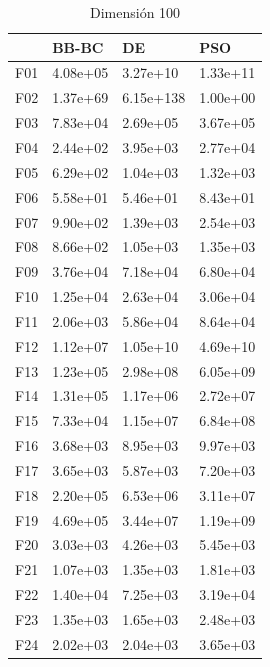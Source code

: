 \begin{table}[H]
\begin{minipage}{.5\linewidth}
    \end{minipage}%
    \begin{minipage}{.5\linewidth}
      \centering
      \caption{Dimensión 100}
      \begin{tabular}{llll}
        \toprule
        {} &     BB-BC &         DE &       PSO \\
        \midrule
        F01  &  4.08e+05 &   3.27e+10 &  1.33e+11 \\
        F02  &  1.37e+69 &  6.15e+138 &  1.00e+00 \\
        F03  &  7.83e+04 &   2.69e+05 &  3.67e+05 \\
        F04  &  2.44e+02 &   3.95e+03 &  2.77e+04 \\
        F05  &  6.29e+02 &   1.04e+03 &  1.32e+03 \\
        F06  &  5.58e+01 &   5.46e+01 &  8.43e+01 \\
        F07  &  9.90e+02 &   1.39e+03 &  2.54e+03 \\
        F08  &  8.66e+02 &   1.05e+03 &  1.35e+03 \\
        F09  &  3.76e+04 &   7.18e+04 &  6.80e+04 \\
        F10  &  1.25e+04 &   2.63e+04 &  3.06e+04 \\
        F11  &  2.06e+03 &   5.86e+04 &  8.64e+04 \\
        F12  &  1.12e+07 &   1.05e+10 &  4.69e+10 \\
        F13  &  1.23e+05 &   2.98e+08 &  6.05e+09 \\
        F14  &  1.31e+05 &   1.17e+06 &  2.72e+07 \\
        F15  &  7.33e+04 &   1.15e+07 &  6.84e+08 \\
        F16  &  3.68e+03 &   8.95e+03 &  9.97e+03 \\
        F17  &  3.65e+03 &   5.87e+03 &  7.20e+03 \\
        F18  &  2.20e+05 &   6.53e+06 &  3.11e+07 \\
        F19  &  4.69e+05 &   3.44e+07 &  1.19e+09 \\
        F20  &  3.03e+03 &   4.26e+03 &  5.45e+03 \\
        F21  &  1.07e+03 &   1.35e+03 &  1.81e+03 \\
        F22  &  1.40e+04 &   7.25e+03 &  3.19e+04 \\
        F23  &  1.35e+03 &   1.65e+03 &  2.48e+03 \\
        F24  &  2.02e+03 &   2.04e+03 &  3.65e+03 \\

\end{tabular}
\end{minipage}
\end{table}
